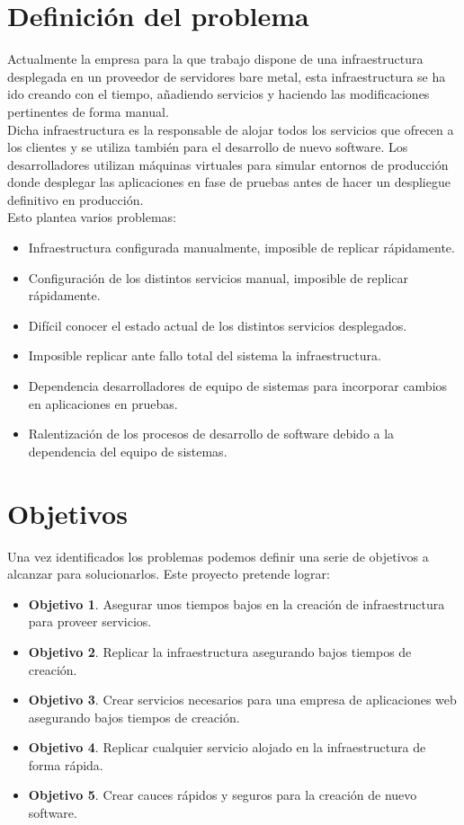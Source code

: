 \section{Definición del problema}
	\begin{text}
		Actualmente la empresa para la que trabajo dispone de una infraestructura desplegada en un proveedor de servidores bare metal, esta infraestructura se ha ido creando con el tiempo, añadiendo servicios y haciendo las modificaciones pertinentes de forma manual. \\
		Dicha infraestructura es la responsable de alojar todos los servicios que ofrecen a los clientes y se utiliza también para el desarrollo de nuevo software. Los desarrolladores utilizan máquinas virtuales para simular entornos de producción donde desplegar las aplicaciones en fase de pruebas antes de hacer un despliegue definitivo en producción. \\
		Esto plantea varios problemas:
		\begin{itemize}
			\item Infraestructura configurada manualmente, imposible de replicar rápidamente.
			\item Configuración de los distintos servicios manual, imposible de replicar rápidamente. 
			\item Difícil conocer el estado actual de los distintos servicios desplegados. 
			\item Imposible replicar ante fallo total del sistema la infraestructura.
			\item Dependencia desarrolladores de equipo de sistemas para incorporar cambios en aplicaciones en pruebas.
			\item Ralentización de los procesos de desarrollo de software debido a la dependencia del equipo de sistemas.
		\end{itemize}
	\end{text}

\section{Objetivos}
\label{objetivos_primarios}
\begin{text}
	Una vez identificados los problemas podemos definir una serie de objetivos a alcanzar para solucionarlos. Este proyecto pretende lograr:
	\begin{itemize}
		\item \textbf{Objetivo 1}. Asegurar unos tiempos bajos en la creación de infraestructura para proveer servicios.
		\item \textbf{Objetivo 2}. Replicar la infraestructura asegurando bajos tiempos de creación.
		\item \textbf{Objetivo 3}. Crear servicios necesarios para una empresa de aplicaciones web asegurando bajos tiempos de creación.
		\item \textbf{Objetivo 4}. Replicar cualquier servicio alojado en la infraestructura de forma rápida.
		\item \textbf{Objetivo 5}. Crear cauces rápidos y seguros para la creación de nuevo software.
	\end{itemize}
\end{text}

